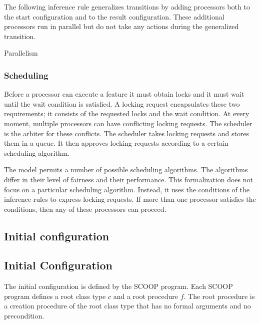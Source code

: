 The following inference rule generalizes transitions by adding processors both to the start configuration and to the result configuration. These additional processors run in parallel but do not take any actions during the generalized transition.

\singlelineinferencerule
	{Parallelism}
	{
		\singlelinetransition
			{}
			{}
	}
	{}
	{}
 
\subsubsection{Scheduling}\label{sec:scheduling}
Before a processor can execute a feature it must obtain locks and it must wait until the wait condition is satisfied. A locking request encapsulates these two requirements; it consists of the requested locks and the wait condition. At every moment, multiple processors can have conflicting locking requests. The scheduler is the arbiter for these conflicts. The scheduler takes locking requests and stores them in a queue. It then approves locking requests according to a certain scheduling algorithm.

The model permits a number of possible scheduling algorithms. The algorithms differ in their level of fairness and their performance. This formalization does not focus on a particular scheduling algorithm. Instead, it uses the conditions of the inference rules to express locking requests. If more than one processor satisfies the conditions, then any of these processors can proceed.

\begin{fortechnicalreport}
\subsection{Initial configuration}
\end{fortechnicalreport}
\begin{forjournal}
\subsection{Initial Configuration}
\end{forjournal}
The initial configuration is defined by the SCOOP program. Each SCOOP program defines a root class type $c$ and a root procedure $f$. The root procedure is a creation procedure of the root class type that has no formal arguments and no precondition.

